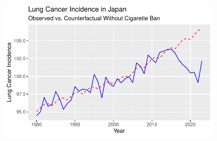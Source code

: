 \documentclass[
  letterpaper,
  DIV=11,
  numbers=noendperiod]{scrartcl}
\begin{document}
\begin{figure}[H]

{\centering \includegraphics{ts_files/figure-pdf/unnamed-chunk-8-1.pdf}

}

\end{figure}
\end{document}
